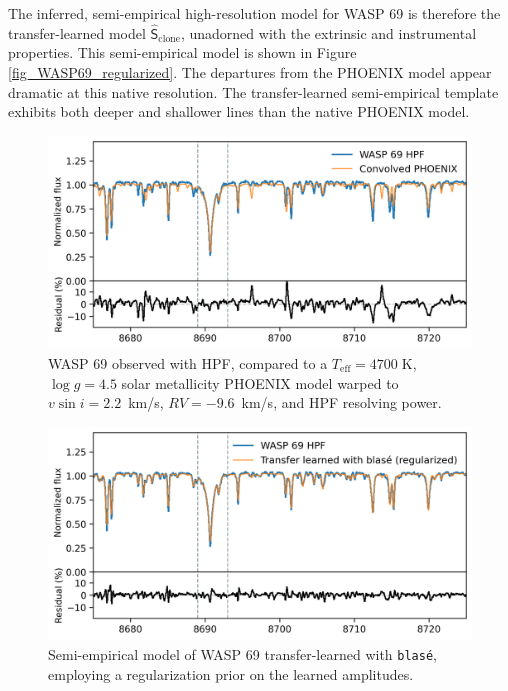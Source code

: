 \documentclass[twocolumn]{aastex631}
\begin{document}
The inferred, semi-empirical high-resolution model for WASP 69 is therefore the transfer-learned model $\mathsf{\hat{S}}_\mathrm{clone}$, unadorned with the extrinsic and instrumental properties.  This semi-empirical model is shown in Figure \ref{fig_WASP69_regularized}.  The departures from the PHOENIX model appear dramatic at this native resolution.  The transfer-learned semi-empirical template exhibits both deeper and shallower lines than the native PHOENIX model.


\begin{figure}[hbt!]
    \centering
    \includegraphics[width=0.98\columnwidth]{blase_WASP69_demo.png}
    \caption{WASP 69 observed with HPF, compared to a $T_{\mathrm{eff}}=4700\;$K,  $\log{g}=4.5$ solar metallicity PHOENIX model warped to $v\sin{i}=2.2$~km/s, $RV=-9.6$~km/s, and HPF resolving power.}
    \label{fig_WASP69_demo}
\end{figure}

\begin{figure}[hbt!]
    \centering
    \includegraphics[width=0.98\columnwidth]{blase_WASP69_regularized.png}
    \caption{Semi-empirical model of WASP 69 transfer-learned with \texttt{blas\'e}, employing a regularization prior on the learned amplitudes.}
    \label{fig_WASP69_transferred}
\end{figure}
\end{document}

